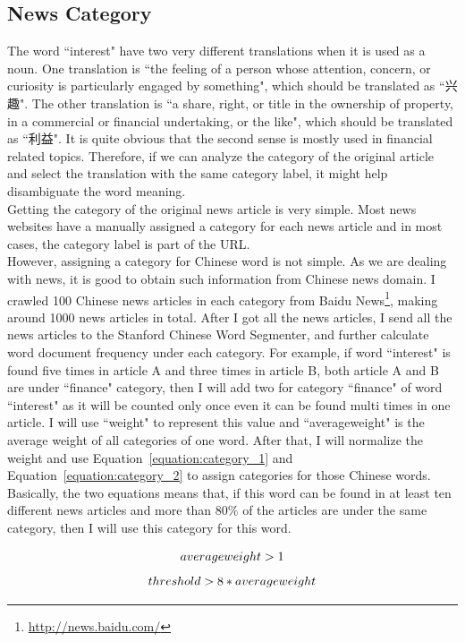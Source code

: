 \subsection{News Category}
The word ``interest" have two very different translations when it is used as a noun. One translation is ``the feeling of a person whose attention, concern, or curiosity is particularly engaged by something", which should be translated as ``兴趣". The other translation is ``a share, right, or title in the ownership of property, in a commercial or financial undertaking, or the like", which should be translated as ``利益". It is quite obvious that the second sense is mostly used in financial related topics. Therefore, if we can analyze the category of the original article and 
select the translation with the same category label, it might help disambiguate the word meaning.
\\
Getting the category of the original news article is very simple. Most news websites have a manually assigned a category for each news article and in most cases, the category label is part of the URL.
\\
However, assigning a category for Chinese word is not simple. As we are dealing with news, it is good to obtain such information from Chinese news domain. I crawled 100 Chinese news articles in each category from  Baidu News\footnote{\url{http://news.baidu.com/}}, making around 1000 news articles in total. After I got all the news articles, I send all the news articles to the Stanford Chinese Word Segmenter, and further calculate word document frequency under each  category. For example, if word ``interest" is found five times in article A and three times in article B, both article A and B are under ``finance" category, then I will add two for category ``finance" of word ``interest" as it will be counted only once even it can be found multi times in one article. I will use ``weight" to represent this value and ``averageweight" is the average weight of all categories of one word. After that, I will normalize the weight and use Equation~\ref{equation:category_1} and Equation~\ref{equation:category_2} to assign categories for those Chinese words. Basically, the two equations means that, if this word can be found in at least ten different news articles and more than 80\% of the articles are under the same category, then I will use this category for this word.

\begin{equation}
averageweight > 1\\
\label{equation:category_1} 
\end{equation}  
\begin{equation}    
threshold > 8 * averageweight\\
\label{equation:category_2}
\end{equation}

